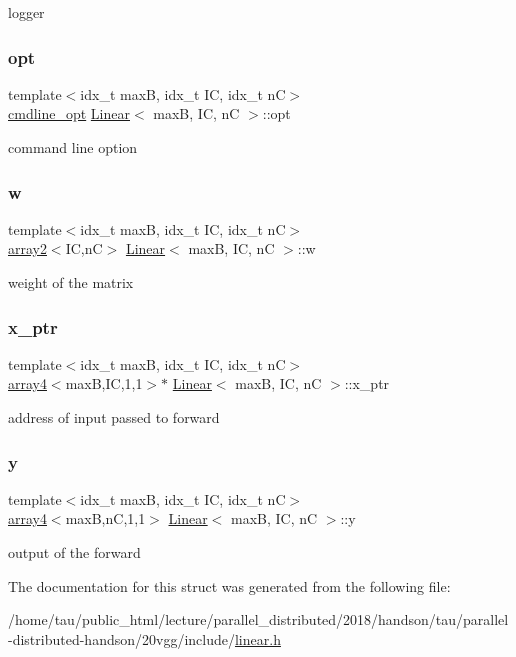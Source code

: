 logger \mbox{\label{structLinear_ad6b0173f0baf5ce07b3cd7340d4ed0d4}} 
\subsubsection{\texorpdfstring{opt}{opt}}
{\footnotesize\ttfamily template$<$idx\+\_\+t maxB, idx\+\_\+t IC, idx\+\_\+t nC$>$ \\
\hyperlink{structcmdline__opt}{cmdline\+\_\+opt} \hyperlink{structLinear}{Linear}$<$ maxB, IC, nC $>$\+::opt}

command line option \mbox{\label{structLinear_a5abe6ceff587b423273808d94b392ee8}} 
\subsubsection{\texorpdfstring{w}{w}}
{\footnotesize\ttfamily template$<$idx\+\_\+t maxB, idx\+\_\+t IC, idx\+\_\+t nC$>$ \\
\hyperlink{structarray2}{array2}$<$IC,nC$>$ \hyperlink{structLinear}{Linear}$<$ maxB, IC, nC $>$\+::w}

weight of the matrix \mbox{\label{structLinear_a8a7c8ecf358de5e00589a722a0c4541c}} 
\subsubsection{\texorpdfstring{x\+\_\+ptr}{x\_ptr}}
{\footnotesize\ttfamily template$<$idx\+\_\+t maxB, idx\+\_\+t IC, idx\+\_\+t nC$>$ \\
\hyperlink{structarray4}{array4}$<$maxB,IC,1,1$>$$\ast$ \hyperlink{structLinear}{Linear}$<$ maxB, IC, nC $>$\+::x\+\_\+ptr}

address of input passed to forward \mbox{\label{structLinear_a422f2130612692682fdd151b96899264}} 
\subsubsection{\texorpdfstring{y}{y}}
{\footnotesize\ttfamily template$<$idx\+\_\+t maxB, idx\+\_\+t IC, idx\+\_\+t nC$>$ \\
\hyperlink{structarray4}{array4}$<$maxB,nC,1,1$>$ \hyperlink{structLinear}{Linear}$<$ maxB, IC, nC $>$\+::y}

output of the forward 

The documentation for this struct was generated from the following file\+:\begin{DoxyCompactItemize}
\item 
/home/tau/public\+\_\+html/lecture/parallel\+\_\+distributed/2018/handson/tau/parallel-\/distributed-\/handson/20vgg/include/\hyperlink{linear_8h}{linear.\+h}\end{DoxyCompactItemize}
